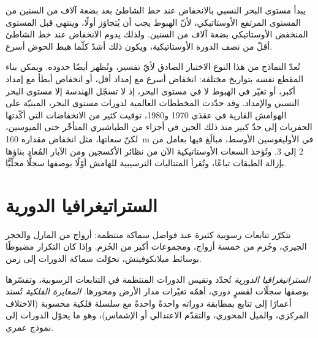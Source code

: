 \begin{omfigure}
\par{}\label{fig:b3:sequence-stratigraphy:section}
\end{omfigure}


يبدأ مستوى البحر النسبي بالانخفاض عند خط الشاطئ بعد بضعة آلاف من السنين
من المستوى المرتفع الأوستاتيكي، لأنّ الهبوط يجب أن يُتجاوَز أولًا،
وينتهي قبل المستوى المنخفض الأوستاتيكي بضعة آلاف من السنين.
ولذلك يدوم الانخفاض عند خط الشاطئ أقلّ من نصف الدورة الأوستاتيكية، ويكون ذلك أشدّ
كلّما هبط الحوض أسرع.

تُعدّ النماذج من هذا النوع الاختبار الصادق لأيّ تفسير، وتُظهر أيضًا
حدوده. ويمكن بناء المقطع نفسه بتواريخ مختلفة: انخفاض أسرع مع إمداد أقل،
أو انخفاض أبطأ مع إمداد أكبر، أو تغيّر في الهبوط لا في مستوى البحر،
إذ لا تسجّل الهندسة إلا مستوى البحر النسبي
والإمداد. وقد حدّدت المخططات العالمية لدورات مستوى البحر، المبنيّة على الهوامش القارية في عقدَي 1970 و1980،
توقيت كثير من الانخفاضات التي أكّدتها الحفريات إلى حدّ كبير منذ ذلك الحين
في أجزاء من الطباشيري المتأخّر حتى الميوسين، لكنّ سعاتها،
مثل انخفاض مقداره \qty{160}{m} في الأوليغوسين الأوسط، مبالَغ فيها بعامل من 2 إلى 3.
وتُؤخذ السعات الأوستاتيكية الآن من نظائر الأكسجين
ومن الآبار المُعاد بناؤها بإزالة الطبقات تباعًا، وتُقرأ المتتاليات الترسيبية للهامش
أوّلًا بوصفها سجلًّا محلّيًّا.

\section{الستراتيغرافيا الدورية}\label{sec:b3:sequence-stratigraphy:cyclo}

تتكرّر تتابعات رسوبية كثيرة عند فواصل سماكة منتظمة: أزواج
من المارل والحجر الجيري، وحُزم من خمسة أزواج، ومجموعات أكبر من الحُزم. وإذا
كان التكرار مضبوطًا بوسائط ميلانكوفيتش، تحوّلت سماكة الدورات
إلى زمن.

\begin{definition}\label{def:b3:sequence-stratigraphy:cyclo}
\emph{الستراتيغرافيا الدورية} تُحدّد وتقيس
الدورات المنتظمة في التتابعات الرسوبية، وتفسّرها بوصفها سجلّات
لقسرٍ دوري، أهمّه تغيّرات مدار الأرض ومحورها.
\emph{المعايرة الفلكية} تُسند أعمارًا إلى تتابع
بمطابقة دوراته واحدةً واحدةً مع
سلسلة فلكية محسوبة (الاختلاف المركزي، والميل المحوري، والتقدّم الاعتدالي أو الإشماس)، وهو ما يحوّل
الدورات إلى نموذج عمري.
\end{definition}

